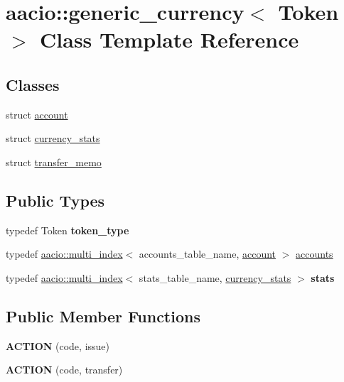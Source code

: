 \hypertarget{classaacio_1_1generic__currency}{}\section{aacio\+:\+:generic\+\_\+currency$<$ Token $>$ Class Template Reference}
\label{classaacio_1_1generic__currency}
\subsection*{Classes}
\begin{DoxyCompactItemize}
\item 
struct \mbox{\hyperlink{structaacio_1_1generic__currency_1_1account}{account}}
\item 
struct \mbox{\hyperlink{structaacio_1_1generic__currency_1_1currency__stats}{currency\+\_\+stats}}
\item 
struct \mbox{\hyperlink{structaacio_1_1generic__currency_1_1transfer__memo}{transfer\+\_\+memo}}
\end{DoxyCompactItemize}
\subsection*{Public Types}
\begin{DoxyCompactItemize}
\item 
\mbox{\label{classaacio_1_1generic__currency_a26c1b9acacbc275fee34a03a0c493f72}} 
typedef Token {\bfseries token\+\_\+type}
\item 
typedef \mbox{\hyperlink{classaacio_1_1multi__index}{aacio\+::multi\+\_\+index}}$<$ accounts\+\_\+table\+\_\+name, \mbox{\hyperlink{structaacio_1_1generic__currency_1_1account}{account}} $>$ \mbox{\hyperlink{classaacio_1_1generic__currency_acd98341a9c4955cf55e91a9e61eb6a7e}{accounts}}
\item 
\mbox{\label{classaacio_1_1generic__currency_a345973974059d7dc431021343babb793}} 
typedef \mbox{\hyperlink{classaacio_1_1multi__index}{aacio\+::multi\+\_\+index}}$<$ stats\+\_\+table\+\_\+name, \mbox{\hyperlink{structaacio_1_1generic__currency_1_1currency__stats}{currency\+\_\+stats}} $>$ {\bfseries stats}
\end{DoxyCompactItemize}
\subsection*{Public Member Functions}
\begin{DoxyCompactItemize}
\item 
\mbox{\label{classaacio_1_1generic__currency_a9cc3b70f50d0ad3903247b42751acfaa}} 
{\bfseries A\+C\+T\+I\+ON} (code, issue)
\item 
\mbox{\label{classaacio_1_1generic__currency_af03c07981816e2525bfb830aca963d74}} 
{\bfseries A\+C\+T\+I\+ON} (code, transfer)
\end{DoxyCompactItemize}
